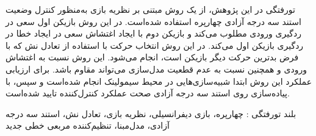 


\pagestyle{plain}

\begin{وسط‌چین}
\end{وسط‌چین}

‌تورفتگی در این پژوهش، از یک روش مبتنی بر نظریه بازی به‌منظور کنترل وضعیت استند سه درجه آزادی چهارپره استفاده شده‌است. 
در این روش بازیکن اول سعی در ردگیری ورودی مطلوب می‌کند و بازیکن دوم با ایجاد اغتشاش سعی در ایجاد خطا  در ردگیری بازیکن اول می‌کند.
در این روش انتخاب حرکت با استفاده از تعادل نش که با فرض بدترین حرکت دیگر بازیکن است،  انجام می‌شود.
این روش نسبت به اغتشاش ورودی و همچنین نسبت به عدم قطعیت مدل‌سازی  می‌تواند مقاوم باشد.
برای ارزیابی عملکرد این روش ابتدا شبیه‌سازی‌هایی در محیط سیمولینک انجام شده‌است و سپس، با پیاده‌سازی روی استند سه درجه آزادی صحت عملکرد کنترل‌کننده تایید شده‌است. 

‌بلند
‌تورفتگی : 
چهارپره،  بازی دیفرانسیلی، نظریه بازی، تعادل نش، استند سه درجه آزادی، مدل‌مبنا، تنظیم‌کننده مربعی خطی 
‌جدید
